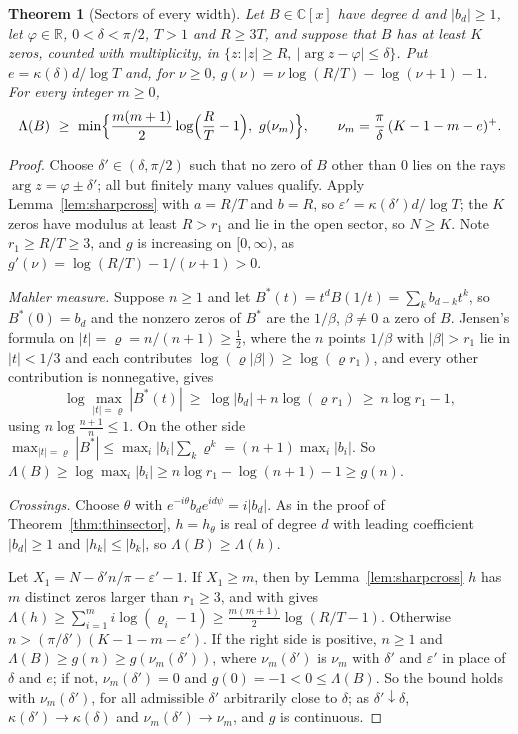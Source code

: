 \documentclass[11pt]{article}
\newtheorem{theorem}{Theorem}[section]
\newcommand{\R}{\mathbb R}
\begin{document}
\begin{theorem}[Sectors of every width]\label{thm:widesector}
Let $B\in\mathbb C[x]$ have degree $d$ and $|b_d|\ge1$, let $\varphi\in\R$,
$0<\delta<\pi/2$, $T>1$ and $R\ge3T$, and suppose that $B$ has at least $K$
zeros, counted with multiplicity, in
$\{z:|z|\ge R,\ |\arg z-\varphi|\le\delta\}$.  Put
$e=\kappa(\delta)d/\log T$ and, for $\nu\ge0$,
$g(\nu)=\nu\log(R/T)-\log(\nu+1)-1$.  For every integer $m\ge0$,
\[
  \Lambda(B)\ \ge\ \min\Bigl\{\frac{m(m+1)}2\log\Bigl(\frac RT-1\Bigr),\
  g(\nu_m)\Bigr\},\qquad
  \nu_m=\frac\pi\delta\,(K-1-m-e)^+ .
\]
\end{theorem}

\begin{proof}
Choose $\delta'\in(\delta,\pi/2)$ such that no zero of $B$ other than $0$ lies
on the rays $\arg z=\varphi\pm\delta'$; all but finitely many values qualify.
Apply Lemma~\ref{lem:sharpcross} with $a=R/T$ and $b=R$, so
$\varepsilon'=\kappa(\delta')d/\log T$; the $K$ zeros have modulus at least
$R>r_1$ and lie in the open sector, so $N\ge K$.  Note $r_1\ge R/T\ge3$, and
$g$ is increasing on $[0,\infty)$, as $g'(\nu)=\log(R/T)-1/(\nu+1)>0$.

\emph{Mahler measure.}  Suppose $n\ge1$ and let
$B^*(t)=t^dB(1/t)=\sum_kb_{d-k}t^k$, so $B^*(0)=b_d$ and the nonzero zeros of
$B^*$ are the $1/\beta$, $\beta\ne0$ a zero of $B$.  Jensen's formula on
$|t|=\varrho=n/(n+1)\ge\frac12$, where the $n$ points $1/\beta$ with
$|\beta|>r_1$ lie in $|t|<1/3$ and each contributes $\log(\varrho|\beta|)\ge\log(\varrho r_1)$,
and every other contribution is nonnegative, gives
\[
  \log\max_{|t|=\varrho}|B^*(t)|\ \ge\ \log|b_d|+n\log(\varrho r_1)\ \ge\ n\log r_1-1,
\]
using $n\log\frac{n+1}n\le1$.  On the other side
$\max_{|t|=\varrho}|B^*|\le\max_i|b_i|\sum_k\varrho^k=(n+1)\max_i|b_i|$.  So
$\Lambda(B)\ge\log\max_i|b_i|\ge n\log r_1-\log(n+1)-1\ge g(n)$.

\emph{Crossings.}  Choose $\theta$ with $e^{-i\theta}b_de^{id\psi}=i|b_d|$.  As
in the proof of Theorem~\ref{thm:thinsector}, $h=h_\theta$ is real of degree
$d$ with leading coefficient $|b_d|\ge1$ and $|h_k|\le|b_k|$, so
$\Lambda(B)\ge\Lambda(h)$.

Let $X_1=N-\delta'n/\pi-\varepsilon'-1$.  If $X_1\ge m$, then by
Lemma~\ref{lem:sharpcross} $h$ has $m$ distinct zeros larger than
$r_1\ge3$, and \cite[Theorem~3.2]{coefficient-mass} with \cite[Corollary~3.4]{coefficient-mass} gives
$\Lambda(h)\ge\sum_{i=1}^mi\log(\varrho_i-1)\ge\frac{m(m+1)}2\log(R/T-1)$.
Otherwise $n>(\pi/\delta')(K-1-m-\varepsilon')$.  If the right side is positive,
$n\ge1$ and $\Lambda(B)\ge g(n)\ge g(\nu_m(\delta'))$, where $\nu_m(\delta')$
is $\nu_m$ with $\delta'$ and $\varepsilon'$ in place of $\delta$ and $e$; if not,
$\nu_m(\delta')=0$ and $g(0)=-1<0\le\Lambda(B)$.  So the bound holds with
$\nu_m(\delta')$, for all admissible $\delta'$ arbitrarily close to $\delta$;
as $\delta'\downarrow\delta$, $\kappa(\delta')\to\kappa(\delta)$ and
$\nu_m(\delta')\to\nu_m$, and $g$ is continuous.

\end{proof}
\end{document}
